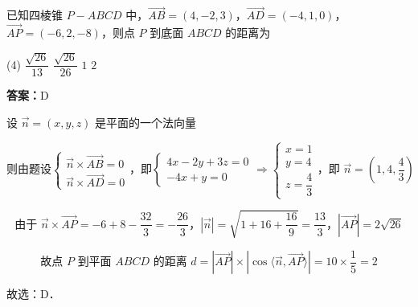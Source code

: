 \begin{example}[\bkstar{3}{5}]
已知四棱锥 $P-ABCD$ 中，$\overrightarrow{AB}=(4,-2,3)$，$\overrightarrow{AD}=(-4,1,0)$，$\overrightarrow{AP}=(-6,2,-8)$，则点 $P$ 到底面 $ABCD$ 的距离为
\begin{tasks}(4)
    \task $\dfrac{\sqrt{26}}{13}$
    \task $\dfrac{\sqrt{26}}{26}$
    \task $1$
    \task $2$
\end{tasks}
\end{example}
\begin{solution}
\textbf{答案：}D

设 $\overrightarrow{n}=(x,y,z)$ 是平面的一个法向量

$$
\text{则由题设}\left\{\begin{array}{l}
\overrightarrow{n}\times\overrightarrow{AB}=0\\
\overrightarrow{n}\times\overrightarrow{AD}=0
\end{array}\right.\text{，即}\left\{\begin{array}{l}
4x-2y+3z=0\\
-4x+y=0
\end{array}\right.\Rightarrow\left\{\begin{array}{l}
x=1\\
y=4\\
z=\dfrac{4}{3}
\end{array}\right.\text{，即 }\overrightarrow{n}=\left(1,4,\dfrac{4}{3}\right)
$$

$$
\text{由于 }\overrightarrow{n}\times\overrightarrow{AP}=-6+8-\dfrac{32}{3}=-\dfrac{26}{3}\text{，}\left|\overrightarrow{n}\right|=\sqrt{1+16+\dfrac{16}{9}}=\dfrac{13}{3}\text{，}\left|\overrightarrow{AP}\right|=2\sqrt{26}
$$

$$
\text{故点 }P\text{ 到平面 }ABCD\text{ 的距离 }d=\left|\overrightarrow{AP}\right|\times\left|\cos\langle\overrightarrow{n},\overrightarrow{AP}\rangle\right|=10\times\dfrac{1}{5}=2
$$

故选：D．
\end{solution}

\vspace{2em}


